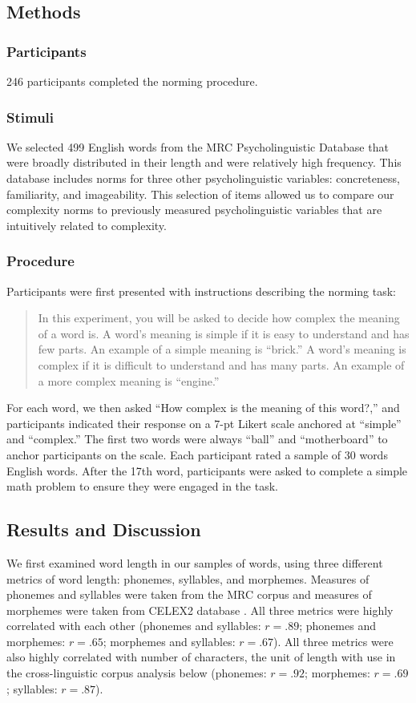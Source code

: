 \subsection{Methods}
\subsubsection{Participants} 246 participants completed the norming procedure.
\subsubsection{Stimuli}
We selected 499 English words from the MRC Psycholinguistic Database \cite{wilson1988mrc} that were broadly distributed in their length and were relatively high frequency. This database includes norms for three other psycholinguistic variables: concreteness, familiarity, and imageability. This selection of items allowed us to compare our complexity norms to previously measured psycholinguistic variables that are intuitively related to complexity.

\subsubsection{Procedure}
Participants were first presented with instructions describing the norming task:
\begin{quote}
In this experiment, you will be asked to decide how complex the meaning of a word is. A word's meaning is simple if it is easy to understand and has few parts. An example of a simple meaning is ``brick.'' A word's meaning is complex if it is difficult to understand and has many parts. An example of a more complex meaning is ``engine.''
\end{quote}
For each word, we then asked ``How complex is the meaning of this word?,'' and participants indicated their response on a 7-pt Likert scale anchored at ``simple'' and ``complex.'' The first two words were always ``ball'' and ``motherboard'' to anchor participants on the scale. Each participant rated a sample of 30 words English words. After the 17th word, participants were asked to complete a simple math problem to ensure they were engaged in the task.

\subsection{Results and Discussion}

We first examined word length in our samples of words, using three different metrics of word length: phonemes, syllables, and morphemes. Measures of phonemes and syllables were taken from the MRC corpus \cite{wilson1988mrc} and measures of morphemes were taken from CELEX2 database \cite{baayen1995celex2}. All three metrics were highly correlated with each other (phonemes and syllables: $r = .89$; phonemes and morphemes: $r = .65$; morphemes and syllables: $r = .67$). All three metrics were also highly correlated with number of characters, the unit of length with use in the cross-linguistic corpus analysis below (phonemes: $r = .92$; morphemes: $r = .69$; syllables: $r = .87$).

